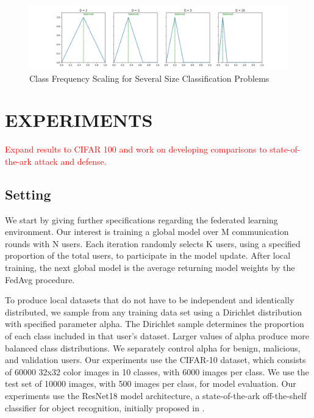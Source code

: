 \documentclass{article} %
\begin{document}
\begin{figure}[H]
    \centering
    \includegraphics[width=\textwidth]{99_article/99_visuals/extra_plots/scaling.png}
    \caption{Class Frequency Scaling for Several Size Classification Problems}
    \label{fig:scaling}
\end{figure}

\section{EXPERIMENTS}

\textcolor{red}{Expand results to CIFAR 100 and work on developing comparisons to state-of-the-ark attack and defense.}

%
\subsection{Setting}

We start by giving further specifications regarding the federated learning environment. Our interest is training a global model over M communication rounds with N users. Each iteration randomly selects K users, using a specified proportion of the total users, to participate in the model update. After local training, the next global model is the average returning model weights by the FedAvg procedure. 

To produce local datasets that do not have to be independent and identically distributed, we sample from any training data set using a Dirichlet distribution with specified parameter alpha. The Dirichlet sample determines the proportion of each class included in that user's dataset. Larger values of alpha produce more balanced class distributions. We separately control alpha for benign, malicious, and validation users. Our experiments use the CIFAR-10 dataset, which consists of 60000 32x32 color images in 10 classes, with 6000 images per class. We use the test set of 10000 images, with 500 images per class, for model evaluation. Our experiments use the ResNet18 model architecture, a state-of-the-ark off-the-shelf classifier for object recognition, initially proposed in \cite{resnet}. 
\end{document}

